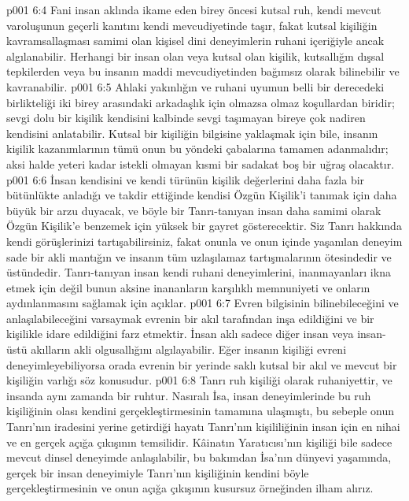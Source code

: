 \vs p001 6:4 Fani insan aklında ikame eden birey öncesi kutsal ruh, kendi mevcut varoluşunun geçerli kanıtını kendi mevcudiyetinde taşır, fakat kutsal kişiliğin kavramsallaşması samimi olan kişisel dini deneyimlerin ruhani içeriğiyle ancak algılanabilir. Herhangi bir insan olan veya kutsal olan kişilik, kutsallığın dışsal tepkilerden veya bu insanın maddi mevcudiyetinden bağımsız olarak bilinebilir ve kavranabilir.
\vs p001 6:5 Ahlaki yakınlığın ve ruhani uyumun belli bir derecedeki birlikteliği iki birey arasındaki arkadaşlık için olmazsa olmaz koşullardan biridir; sevgi dolu bir kişilik kendisini kalbinde sevgi taşımayan bireye çok nadiren kendisini anlatabilir. Kutsal bir kişiliğin bilgisine yaklaşmak için bile, insanın kişilik kazanımlarının tümü onun bu yöndeki çabalarına tamamen adanmalıdır; aksi halde yeteri kadar istekli olmayan kısmi bir sadakat boş bir uğraş olacaktır.
\vs p001 6:6 İnsan kendisini ve kendi türünün kişilik değerlerini daha fazla bir bütünlükte anladığı ve takdir ettiğinde kendisi Özgün Kişilik’i tanımak için daha büyük bir arzu duyacak, ve böyle bir Tanrı\hyp{}tanıyan insan daha samimi olarak Özgün Kişilik’e benzemek için yüksek bir gayret gösterecektir. Siz Tanrı hakkında kendi görüşlerinizi tartışabilirsiniz, fakat onunla ve onun içinde yaşanılan deneyim sade bir akli mantığın ve insanın tüm uzlaşılamaz tartışmalarının ötesindedir ve üstündedir. Tanrı\hyp{}tanıyan insan kendi ruhani deneyimlerini, inanmayanları ikna etmek için değil bunun aksine inananların karşılıklı memnuniyeti ve onların aydınlanmasını sağlamak için açıklar.
\vs p001 6:7 Evren bilgisinin bilinebileceğini ve anlaşılabileceğini varsaymak evrenin bir akıl tarafından inşa edildiğini ve bir kişilikle idare edildiğini farz etmektir. İnsan aklı sadece diğer insan veya insan\hyp{}üstü akılların akli olgusallığını algılayabilir. Eğer insanın kişiliği evreni deneyimleyebiliyorsa orada evrenin bir yerinde saklı kutsal bir akıl ve mevcut bir kişiliğin varlığı söz konusudur.
\vs p001 6:8 Tanrı ruh kişiliği olarak ruhaniyettir, ve insanda aynı zamanda bir ruhtur. Nasıralı İsa, insan deneyimlerinde bu ruh kişiliğinin olası kendini gerçekleştirmesinin tamamına ulaşmıştı, bu sebeple onun Tanrı’nın iradesini yerine getirdiği hayatı Tanrı’nın kişililiğinin insan için en nihai ve en gerçek açığa çıkışının temsilidir. Kâinatın Yaratıcısı’nın kişiliği bile sadece mevcut dinsel deneyimde anlaşılabilir, bu bakımdan İsa’nın dünyevi yaşamında, gerçek bir insan deneyimiyle Tanrı’nın kişiliğinin kendini böyle gerçekleştirmesinin ve onun açığa çıkışının kusursuz örneğinden ilham alırız.
